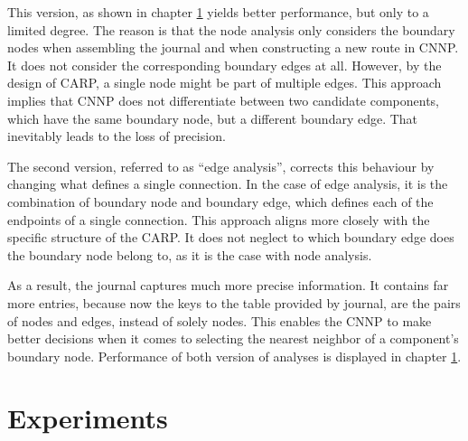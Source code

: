 \documentclass[twoside]{ctuthesis}
\theoremstyle{plain}
\theoremstyle{definition}
\theoremstyle{note}
\begin{document}
This version, as shown in chapter \ref{sec:experiments} yields better performance, but only to a limited degree. The reason is that the node analysis only considers the boundary nodes when assembling the journal and when constructing a new route in CNNP. It does not consider the corresponding boundary edges at all. However, by the design of CARP, a single node might be part of multiple edges. This approach implies that CNNP does not differentiate between two candidate components, which have the same boundary node, but a different boundary edge. That inevitably leads to the loss of precision.

The second version, referred to as ``edge analysis'', corrects this behaviour by changing what defines a single connection. In the case of edge analysis, it is the combination of boundary node and boundary edge, which defines each of the endpoints of a single connection.
 This approach aligns more closely with the specific structure of the CARP. It does not neglect to which boundary edge does the boundary node belong to, as it is the case with node analysis.

As a result, the journal captures much more precise information. It contains far more entries, because now the keys to the table provided by journal, are the pairs of nodes and edges, instead of solely nodes. 
This enables the CNNP to make better decisions when it comes to selecting the nearest neighbor of a component's boundary node.
Performance of both version of analyses is displayed in chapter \ref{sec:experiments}.


%










\chapter{Experiments}
\label{sec:experiments}
\end{document}
